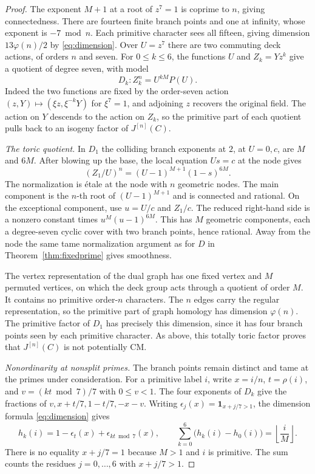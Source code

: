\documentclass[11pt]{article}
\begin{document}
\begin{proof}
The exponent \(M+1\) at a root of \(z^7=1\) is coprime to \(n\),
giving connectedness. There are fourteen finite branch points and
one at infinity, whose exponent is \(-7\bmod n\). Each primitive
character sees all fifteen, giving dimension \(13\varphi(n)/2\)
by \eqref{eq:dimension}. Over \(U=z^7\) there are two commuting deck
actions, of orders \(n\) and seven. For \(0\le k\le6\), the functions
\(U\) and \(Z_k=Yz^k\) give a quotient of degree seven, with model
\[
             D_k\colon Z_k^n=U^{kM}P(U).
\]
Indeed the two functions are fixed by the order-seven action
\((z,Y)\mapsto(\xi z,\xi^{-k}Y)\) for \(\xi^7=1\), and adjoining
\(z\) recovers the original field. The action on \(Y\) descends to
the action on \(Z_k\), so the primitive part of each quotient
pulls back to an isogeny factor of \(J^{[n]}(C)\).

\smallskip
\noindent\textit{The toric quotient.}
In \(D_1\) the colliding branch exponents at \(2\), at \(U=0,c\),
are \(M\) and \(6M\). After blowing up the base, the local equation
\(Us=c\) at the node gives
\[
        (Z_1/U)^n=(U-1)^{M+1}(1-s)^{6M}.
\]
The normalization is \'{e}tale at the node with \(n\) geometric
nodes. The main component is the \(n\)-th root of \((U-1)^{M+1}\)
and is connected and rational. On the exceptional component, use
\(u=U/c\) and \(Z_1/c\). The reduced right-hand side is a nonzero
constant times \(u^M(u-1)^{6M}\). This has \(M\) geometric components,
each a degree-seven cyclic cover with two branch points, hence
rational. Away from the node the same tame normalization argument as
for \(D\) in Theorem~\ref{thm:fixedprime} gives smoothness.

The vertex representation of the dual graph has one fixed vertex
and \(M\) permuted vertices, on which the deck group acts through a
quotient of order \(M\). It contains no primitive order-\(n\)
characters. The \(n\) edges carry the regular representation, so the
primitive part of graph homology has dimension \(\varphi(n)\).
The primitive factor of \(D_1\) has precisely this dimension, since
it has four branch points seen by each primitive character. As
above, this totally toric factor proves that \(J^{[n]}(C)\) is not
potentially CM.

\smallskip
\noindent\textit{Nonordinarity at nonsplit primes.}
The branch points remain distinct and tame at the primes under
consideration. For a primitive label \(i\), write \(x=i/n\),
\(t=\rho(i)\), and \(v=(kt\bmod7)/7\) with \(0\le v<1\).
The four exponents of \(D_k\) give the fractions of \(v,x+t/7,
1-t/7,-x-v\). Writing \(\epsilon_j(x)=\mathbf 1_{x+j/7>1}\),
the dimension formula \eqref{eq:dimension} gives
\[
 h_k(i)=1-\epsilon_t(x)+\epsilon_{kt\bmod7}(x),\qquad
 \sum_{k=0}^6\bigl(h_k(i)-h_0(i)\bigr)=\left\lfloor\frac{i}{M}\right\rfloor.
\]
There is no equality \(x+j/7=1\) because \(M>1\) and \(i\) is
primitive. The sum counts the residues \(j=0,\ldots,6\) with
\(x+j/7>1\).


\end{proof}
\end{document}
